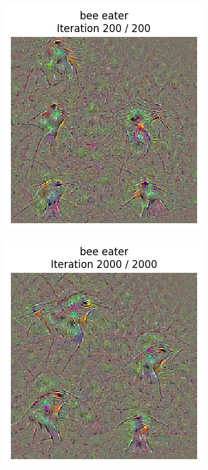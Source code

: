\begin{figure}[H]
\begin{subfigure}[t]{.33\textwidth}
        \includegraphics[width=\linewidth]{figs_propre2/SqueezeNet/SqueezeNet_bird_animated_reg_2_last_frame.png}
        \caption{}
        \label{fig:class_viz_reg:sub2}
    \end{subfigure}%
    \begin{subfigure}[t]{.33\textwidth}
        \centering
        \includegraphics[width=\linewidth]{figs_propre2/SqueezeNet/SqueezeNet_bird_animated_2000_reg_2_last_frame.png}

\end{subfigure}
\end{figure}
